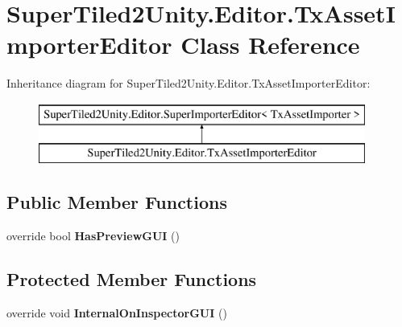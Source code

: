 \hypertarget{class_super_tiled2_unity_1_1_editor_1_1_tx_asset_importer_editor}{}\section{Super\+Tiled2\+Unity.\+Editor.\+Tx\+Asset\+Importer\+Editor Class Reference}
\label{class_super_tiled2_unity_1_1_editor_1_1_tx_asset_importer_editor}
Inheritance diagram for Super\+Tiled2\+Unity.\+Editor.\+Tx\+Asset\+Importer\+Editor\+:\begin{figure}[H]
\begin{center}
\leavevmode
\includegraphics[height=2.000000cm]{class_super_tiled2_unity_1_1_editor_1_1_tx_asset_importer_editor}
\end{center}
\end{figure}
\subsection*{Public Member Functions}
\begin{DoxyCompactItemize}
\item 
\mbox{\label{class_super_tiled2_unity_1_1_editor_1_1_tx_asset_importer_editor_a905e198861793e2c3c01f4c08b733b1c}} 
override bool {\bfseries Has\+Preview\+G\+UI} ()
\end{DoxyCompactItemize}
\subsection*{Protected Member Functions}
\begin{DoxyCompactItemize}
\item 
\mbox{\label{class_super_tiled2_unity_1_1_editor_1_1_tx_asset_importer_editor_a15ad5ad19d1ac0edc6743b3a75498a4b}} 
override void {\bfseries Internal\+On\+Inspector\+G\+UI} ()
\end{DoxyCompactItemize}
